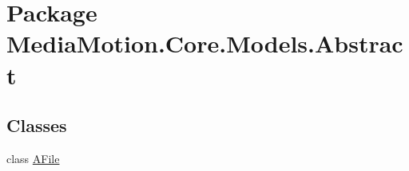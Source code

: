 \hypertarget{namespace_media_motion_1_1_core_1_1_models_1_1_abstract}{\section{Package Media\+Motion.\+Core.\+Models.\+Abstract}
\label{namespace_media_motion_1_1_core_1_1_models_1_1_abstract}
}
\subsection*{Classes}
\begin{DoxyCompactItemize}
\item 
class \hyperlink{class_media_motion_1_1_core_1_1_models_1_1_abstract_1_1_a_file}{A\+File}
\end{DoxyCompactItemize}
